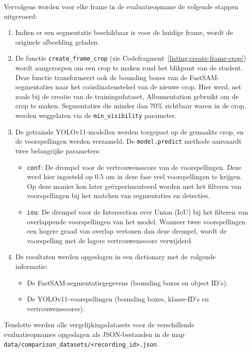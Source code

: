 Vervolgens worden voor elke frame in de evaluatieopname de volgende stappen uitgevoerd:
\begin{enumerate}
    \item Indien er een segmentatie beschikbaar is voor de huidige frame, wordt de originele afbeelding geladen.
    \item De functie \texttt{create\_frame\_crop} (zie Codefragment~\ref{listing:create-frame-crop}) wordt aangeroepen om een crop te maken rond het blikpunt van de student.
    Deze functie transformeert ook de bounding boxes van de FastSAM-segmentaties naar het coördinatenstelsel van de nieuwe crop.
    Hier werd, net zoals bij de creatie van de trainingsdataset, Albumentation gebruikt om de crop te maken.
    Segmentaties die minder dan 70\% zichtbaar waren in de crop, werden weggelaten via de \texttt{min\_visibility} parameter.
    \item De getrainde YOLOv11-modellen werden toegepast op de gemaakte crop, en de voorspellingen werden verzameld.
    De \texttt{model.predict} methode aanvaardt twee belangrijke parameters:
    \begin{itemize}
        \item \texttt{conf}: De drempel voor de vertrouwensscore van de voorspellingen.
        Deze werd hier ingesteld op 0.5 om in deze fase veel voorspellingen te krijgen. 
        Op deze manier kon later geëxperimenteerd worden met het filteren van voorspellingen bij het matchen van segmentaties en detecties.
        \item \texttt{iou}: De drempel voor de Intersection over Union (IoU) bij het filteren van overlappende voorspellingen van het model.
        Wanneer twee voorspellingen een hogere graad van overlap vertonen dan deze drempel, wordt de voorspelling met de lagere vertrouwensscore verwijderd.
    \end{itemize}
    \item De resultaten werden opgeslagen in een dictionary met de volgende informatie:
    \begin{itemize}
        \item De FastSAM-segmentatiegegevens (bounding boxes en object ID's).
        \item De YOLOv11-voorspellingen (bounding boxes, klasse-ID's en vertrouwensscores).
    \end{itemize}
\end{enumerate}
Tenslotte werden alle vergelijkingsdatasets voor de verschillende evaluatieopnames opgeslagen als JSON-bestanden in de map 
\texttt{data/comparison\_datasets/<recording\_id>.json}.

